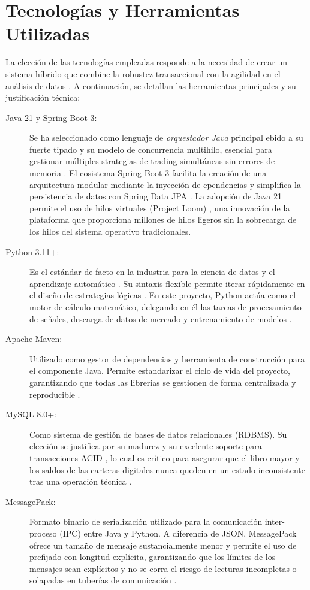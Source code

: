 \section{Tecnologías y Herramientas Utilizadas}

La elección de las tecnologías empleadas responde a la necesidad de crear un sistema híbrido que combine la robustez transaccional con la agilidad en el análisis de datos \parencite{hilpisch_python_2018}. A continuación, se detallan las herramientas principales y su justificación técnica:

\begin{description}
    \item[Java 21 y Spring Boot 3:] Se ha seleccionado como lenguaje de \textit{orquestador Java} principal ebido a su fuerte tipado y su modelo de concurrencia multihilo, esencial para gestionar múltiples strategias de trading simultáneas sin errores de memoria \parencite{treleaven_algorithmic_2013}. El cosistema Spring Boot 3 facilita la creación de una arquitectura modular mediante la inyección de ependencias y simplifica la persistencia de datos con Spring Data JPA \parencite{pivotal_springboot_2024}. La adopción de Java 21 permite el uso de hilos virtuales (Project Loom) \parencite{goetz_jep444_2023}, una innovación de la plataforma que proporciona millones de hilos ligeros sin la sobrecarga de los hilos del sistema operativo tradicionales.
    \item[Python 3.11+:] Es el estándar de facto en la industria para la ciencia de datos y el aprendizaje automático \parencite{goodfellow_deep_2016}. Su sintaxis flexible permite iterar rápidamente en el diseño de estrategias lógicas \parencite{hilpisch_python_2018}. En este proyecto, Python actúa como el motor de cálculo matemático, delegando en él las tareas de procesamiento de señales, descarga de datos de mercado y entrenamiento de modelos \parencite{mckinney_python_2022}.
    \item[Apache Maven:] Utilizado como gestor de dependencias y herramienta de construcción para el componente Java. Permite estandarizar el ciclo de vida del proyecto, garantizando que todas las librerías se gestionen de forma centralizada y reproducible \parencite{apache_maven_2024}.
    \item[MySQL 8.0+:] Como sistema de gestión de bases de datos relacionales (RDBMS). Su elección se justifica por su madurez y su excelente soporte para transacciones ACID \parencite{oracle_mysql_acid_2024}, lo cual es crítico para asegurar que el libro mayor y los saldos de las carteras digitales nunca queden en un estado inconsistente tras una operación técnica \parencite{oracle_mysql_2024}.
    \item[MessagePack:] Formato binario de serialización utilizado para la comunicación inter-proceso (IPC) entre Java y Python. A diferencia de JSON, MessagePack ofrece un tamaño de mensaje sustancialmente menor y permite el uso de prefijado con longitud explícita, garantizando que los límites de los mensajes sean explícitos y no se corra el riesgo de lecturas incompletas o solapadas en tuberías de comunicación \parencite{furuhashi_msgpack_2013}.
\end{description}

